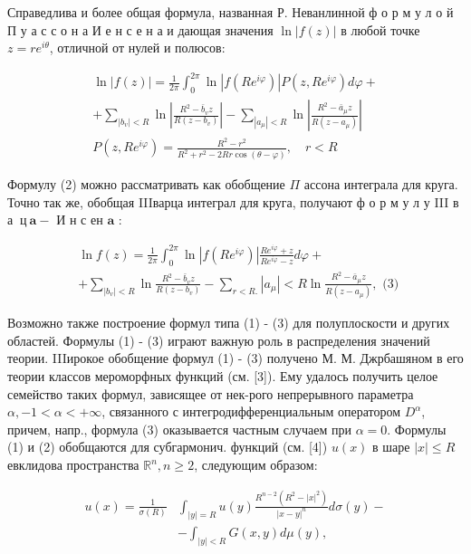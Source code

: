 \documentclass[10pt]{article}
\begin{document}
Справедлива и более общая формула, названная Р. Неванлинной ф о р м у л о й П у а с с о н а И е н с е н а и дающая значения $\ln |f(z)|$ в любой точке $z=r e^{i \theta}$, отличной от нулей и полюсов:



\[

\begin{gathered}

\ln |f(z)|=\frac{1}{2 \pi} \int_{0}^{2 \pi} \ln \left|f\left(R e^{i \varphi}\right)\right| P\left(z, R e^{i \varphi}\right) d \varphi+ \\

+\sum_{\left|b_{v}\right|<R} \ln \left|\frac{R^{2}-\bar{b}_{v} z}{R\left(z-b_{v}\right)}\right|-\sum_{\left|a_{\mu}\right|<R} \ln \left|\frac{R^{2}-\bar{a}_{\mu} z}{R\left(z-a_{\mu}\right)}\right| \\

P\left(z, R e^{i \varphi}\right)=\frac{R^{2}-r^{2}}{R^{2}+r^{2}-2 R r \cos (\theta-\varphi)}, \quad r<R

\end{gathered}

\]



Формулу (2) можно рассматривать как обобщение $\Pi$ ассона интеграла для круга. Точно так же, обобщая IIIварца интеграл для круга, получают ф о р м у л у III в а $\mathbf{~ ц ~} \mathbf{a}-$ И н с ен $\mathbf{a}$ :



\[

\begin{aligned}

& \ln f(z)=\frac{1}{2 \pi} \int_{0}^{2 \pi} \ln \left|f\left(R e^{i \varphi}\right)\right| \frac{R e^{i \varphi}+z}{R e^{i \varphi}-z} d \varphi+ \\

& +\sum_{\left|b_{v}\right|<R} \ln \frac{R^{2}-\bar{b}_{v} z}{R\left(z-b_{v}\right)}-\sum_{r<R .}\left|a_{\mu}\right|<R \ln \frac{R^{2}-\bar{a}_{\mu} z}{R\left(z-a_{\mu}\right)}, \text { (3) }

\end{aligned}

\]



Возможно также построение формул типа (1) - (3) для полуплоскости и других областей. Формулы (1) - (3) играют важную роль в распределения значений теории. IIIирокое обобщение формул (1) - (3) получено М. М. Джрбашяном в его теории классов мероморфных функций (см. [3]). Ему удалось получить целое семейство таких формул, зависящее от нек-рого непрерывного параметра $\alpha,-1<\alpha<+\infty$, связанного с интегродифференциальным оператором $D^{\alpha}$, причем, напр., формула (3) оказывается частным случаем при $\alpha=0$. Формулы (1) и (2) обобщаются для субгармонич. функций (см. [4]) $u(x)$ в шаре $|x| \leqslant R$ евклидова пространства $\mathbb{R}^{n}, n \geqslant 2$, следующим образом:



\[

\begin{aligned}

u(x)=\frac{1}{\sigma(R)} & \int_{|y|=R} u(y) \frac{R^{n-2}\left(R^{2}-|x|^{2}\right)}{|x-y|^{n}} d \sigma(y)- \\

& -\int_{|y|<R} G(x, y) d \mu(y),

\end{aligned}

\]
\end{document}
